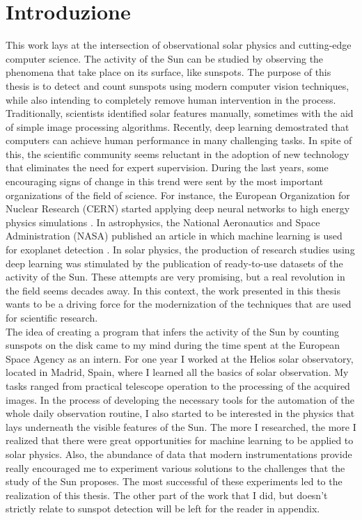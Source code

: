 \chapter{Introduzione}
\label{Introduction}
\thispagestyle{empty}

\noindent This work lays at the intersection of observational solar physics and cutting-edge computer science. The activity of the Sun can be studied by observing the phenomena that take place on its surface, like sunspots. The purpose of this thesis is to detect and count sunspots using modern computer vision techniques, while also intending to completely remove human intervention in the process. Traditionally, scientists identified solar features manually, sometimes with the aid of simple image processing algorithms. Recently, deep learning demostrated that computers can achieve human performance in many challenging tasks. In spite of this, the scientific community seems reluctant in the adoption of new technology that eliminates the need for expert supervision. During the last years, some encouraging signs of change in this trend were sent by the most important organizations of the field of science. For instance, the European Organization for Nuclear Research (CERN) started applying deep neural networks to high energy physics simulations \cite{de2017learning}. In astrophysics, the National Aeronautics and Space Administration (NASA) published an article in which machine learning is used for exoplanet detection \cite{shallue2018identifying}. In solar physics, the production of research studies using deep learning was stimulated by the publication of ready-to-use datasets \cite{McGregor2017} of the activity of the Sun. These attempts are very promising, but a real revolution in the field seems decades away. In this context, the work presented in this thesis wants to be a driving force for the modernization of the techniques that are used for scientific research.\\
The idea of creating a program that infers the activity of the Sun by counting sunspots on the disk came to my mind during the time spent at the European Space Agency as an intern. For one year I worked at the Helios solar observatory, located in Madrid, Spain, where I learned all the basics of solar observation. My tasks ranged from practical telescope operation to the processing of the acquired images. In the process of developing the necessary tools for the automation of the whole daily observation routine, I also started to be interested in the physics that lays underneath the visible features of the Sun. The more I researched, the more I realized that there were great opportunities for machine learning to be applied to solar physics. Also, the abundance of data that modern instrumentations provide really encouraged me to experiment various solutions to the challenges that the study of the Sun proposes. The most successful of these experiments led to the realization of this thesis. The other part of the work that I did, but doesn't strictly relate to sunspot detection will be left for the reader in appendix.\\
